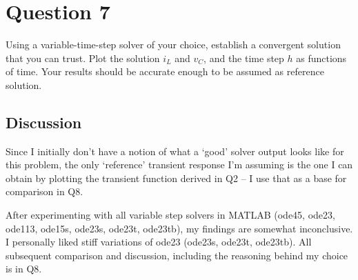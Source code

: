 \clearpage
\section*{Question 7}

Using a variable-time-step solver of your choice, establish a convergent solution that you can trust. Plot the solution $i_L$ and $v_C$, and the time step $h$ as functions of time. Your results should be accurate enough to be assumed as reference solution.

\subsection*{Discussion}

Since I initially don't have a notion of what a `good' solver output looks like for this problem, the only `reference' transient response I'm assuming is the one I can obtain by plotting the transient function derived in Q2 -- I use that as a base for comparison in Q8.

After experimenting with all variable step solvers in MATLAB (ode45, ode23, ode113, ode15s, ode23s, ode23t, ode23tb), my findings are somewhat inconclusive. I personally liked stiff variations of ode23 (ode23s, ode23t, ode23tb). All subsequent comparison and discussion, including the reasoning behind my choice is in Q8.